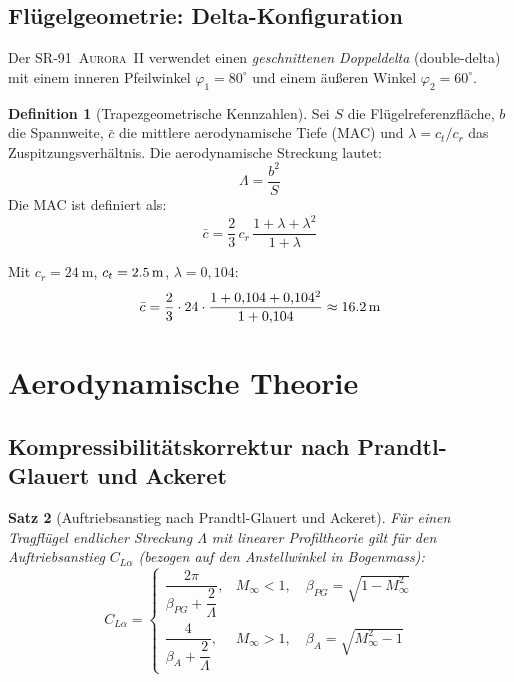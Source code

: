 ﻿\documentclass[12pt,a4paper]{article}
\theoremstyle{plain}
\newtheorem{theorem}{Satz}[section]
\theoremstyle{definition}
\newtheorem{definition}[theorem]{Definition}
\theoremstyle{remark}
\newcommand{\SR}{\textsc{SR-91~Aurora~II}}
\begin{document}
\subsection{Flügelgeometrie: Delta-Konfiguration}

Der \SR{} verwendet einen \emph{geschnittenen Doppeldelta} (double-delta) mit
einem inneren Pfeilwinkel $\varphi_1 = 80^\circ$ und einem äußeren Winkel
$\varphi_2 = 60^\circ$.

\begin{definition}[Trapezgeometrische Kennzahlen]
  Sei $S$ die Flügelreferenzfläche, $b$ die Spannweite, $\bar{c}$ die mittlere
  aerodynamische Tiefe (MAC) und $\lambda = c_t/c_r$ das Zuspitzungsverhältnis.
  Die aerodynamische Streckung lautet:
  \begin{equation}
    \Lambda = \frac{b^2}{S}
    \label{eq:streckung}
  \end{equation}
  Die MAC ist definiert als:
  \begin{equation}
    \bar{c} = \frac{2}{3}\,c_r\,\frac{1 + \lambda + \lambda^2}{1 + \lambda}
    \label{eq:mac}
  \end{equation}
\end{definition}

Mit $c_r = \SI{24}{\metre}$, $c_t = \SI{2{,}5}{\metre}$, $\lambda = 0{,}104$:
\begin{equation}
  \bar{c} = \frac{2}{3} \cdot 24 \cdot \frac{1 + 0{,}104 + 0{,}104^2}{1 + 0{,}104}
  \approx \SI{16{,}2}{\metre}
\end{equation}

\section{Aerodynamische Theorie}
\label{sec:aero}

\subsection{Kompressibilitätskorrektur nach Prandtl-Glauert und Ackeret}

\begin{theorem}[Auftriebsanstieg nach Prandtl-Glauert und Ackeret]
  \label{thm:cla}
  Für einen Tragflügel endlicher Streckung $\Lambda$ mit linearer Profiltheorie gilt
  für den Auftriebsanstieg $C_{L\alpha}$ (bezogen auf den Anstellwinkel in Bogenmass):
  \begin{equation}
    C_{L\alpha} =
    \begin{cases}
      \dfrac{2\pi}{\beta_{PG} + \dfrac{2}{\Lambda}}, & M_\infty < 1, \quad \beta_{PG} = \sqrt{1 - M_\infty^2} \\[10pt]
      \dfrac{4}{\beta_A + \dfrac{2}{\Lambda}}, & M_\infty > 1, \quad \beta_A = \sqrt{M_\infty^2 - 1}
    \end{cases}
    \label{eq:cla}
  \end{equation}
\end{theorem}
\end{document}
